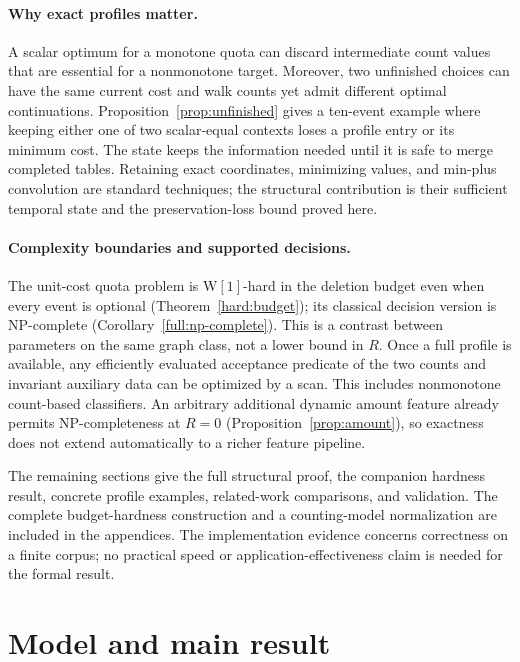\documentclass[11pt]{article}
\theoremstyle{remark}
\begin{document}
\paragraph{Why exact profiles matter.}
A scalar optimum for a monotone quota can discard intermediate count values
that are essential for a nonmonotone target. Moreover, two unfinished choices
can have the same current cost and walk counts yet admit different optimal
continuations. Proposition~\ref{prop:unfinished} gives a ten-event example
where keeping either one of two scalar-equal contexts loses a profile entry
or its minimum cost. The state keeps the information needed until it is safe
to merge completed tables. Retaining exact coordinates, minimizing values,
and min-plus convolution are standard techniques; the structural contribution
is their sufficient temporal state and the preservation-loss bound proved
here.

\paragraph{Complexity boundaries and supported decisions.}
The unit-cost quota problem is $\mathrm{W}[1]$-hard in the deletion budget
even when every event is optional (Theorem~\ref{hard:budget}); its classical
decision version is NP-complete (Corollary~\ref{full:np-complete}). This is a
contrast between parameters on the same graph class, not a lower bound in
$R$. Once a full profile is available, any efficiently evaluated acceptance
predicate of the two counts and invariant auxiliary data can be optimized by
a scan. This includes nonmonotone count-based classifiers. An arbitrary
additional dynamic amount feature already permits NP-completeness at $R=0$
(Proposition~\ref{prop:amount}), so exactness does not extend automatically to
a richer feature pipeline.

The remaining sections give the full structural proof, the companion hardness
result, concrete profile examples, related-work comparisons, and validation.
The complete budget-hardness construction and a counting-model normalization
are included in the appendices. The implementation evidence concerns
correctness on a finite corpus; no practical speed or application-effectiveness
claim is needed for the formal result.

\section{Model and main result}\label{sec:model}
\end{document}
